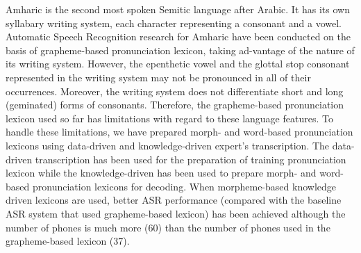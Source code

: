 Amharic is the second most spoken Semitic language after Arabic. It has its own syllabary writing system, each character representing a consonant and a vowel. Automatic Speech Recognition research for Amharic have been conducted on the basis of grapheme-based pronunciation lexicon, taking ad-vantage of the nature of its writing system. However, the epenthetic vowel and the glottal stop consonant represented in the writing system may not be pronounced in all of their occurrences. Moreover, the writing system does not differentiate short and long (geminated) forms of consonants. Therefore, the grapheme-based pronunciation lexicon used so far has limitations with regard to these language features. To handle these limitations, we have prepared morph- and word-based pronunciation lexicons using data-driven and knowledge-driven expert's transcription. The data-driven transcription has been used for the preparation of training pronunciation lexicon while the knowledge-driven has been used to prepare morph- and word-based pronunciation lexicons for decoding. When morpheme-based knowledge driven lexicons are used, better ASR performance (compared with the baseline ASR system that used grapheme-based lexicon) has been achieved although the number of phones is much more (60) than the number of phones used in the grapheme-based lexicon (37).

